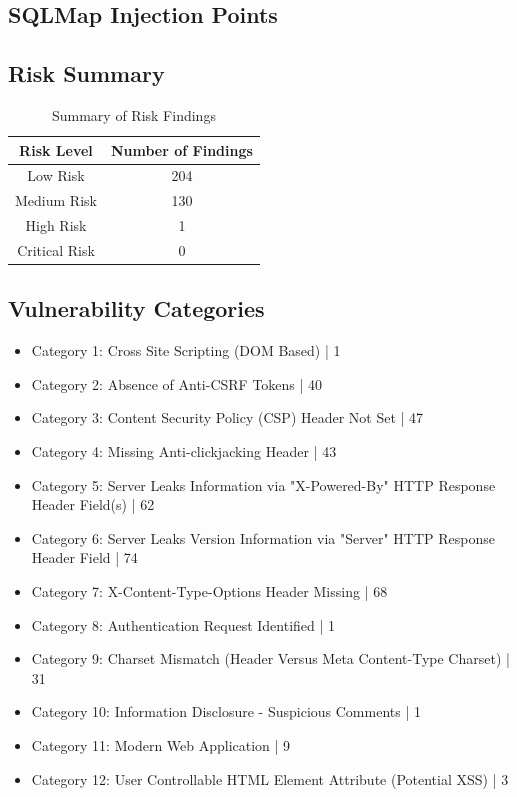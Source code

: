 \documentclass[12pt]{article}
\begin{document}
\subsection{SQLMap Injection Points}

\subsection{Risk Summary}
\begin{table}[h!]
\centering
\renewcommand{\arraystretch}{1.5}
\begin{tabular}{|c|c|}
\hline
\textbf{Risk Level} & \textbf{Number of Findings} \\
\hline
Low Risk & 204 \\ 
\hline
Medium Risk & 130 \\ 
\hline
High Risk & 1 \\ 
\hline
Critical Risk & 0 \\ 
\hline
\end{tabular}
\caption{Summary of Risk Findings}
\label{tab:risk_summary}
\end{table}

\subsection{Vulnerability Categories}
\begin{itemize}
\item Category 1: Cross Site Scripting (DOM Based) | 1
\item Category 2: Absence of Anti-CSRF Tokens | 40
\item Category 3: Content Security Policy (CSP) Header Not Set | 47
\item Category 4: Missing Anti-clickjacking Header | 43
\item Category 5: Server Leaks Information via "X-Powered-By" HTTP Response Header Field(s) | 62
\item Category 6: Server Leaks Version Information via "Server" HTTP Response Header Field | 74
\item Category 7: X-Content-Type-Options Header Missing | 68
\item Category 8: Authentication Request Identified | 1
\item Category 9: Charset Mismatch (Header Versus Meta Content-Type Charset) | 31
\item Category 10: Information Disclosure - Suspicious Comments | 1
\item Category 11: Modern Web Application | 9
\item Category 12: User Controllable HTML Element Attribute (Potential XSS) | 3

\end{itemize}
\end{document}
